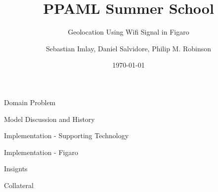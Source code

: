\documentclass[dvips,11pt]{beamer}
\begin{document}
\title{PPAML Summer School}

\subtitle{Geolocation Using Wifi Signal in Figaro}

\author{Sebastian Imlay, Daniel Salvidore, Philip M. Robinson}


\date{\today}

\begin{frame}
  \titlepage
\end{frame}


\begin{frame}{Domain Problem}

\end{frame}

\begin{frame}{Model Discussion and History}

\end{frame}

\begin{frame}{Implementation - Supporting Technology}

\end{frame}

\begin{frame}{Implementation - Figaro}

\end{frame}

\begin{frame}{Insignts}

\end{frame}

\begin{frame}{Collateral}

\end{frame}
\end{document}
